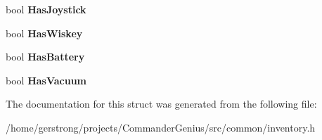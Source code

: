 \begin{DoxyCompactItemize}
\item 
\hypertarget{structst_inventory_aeba3902b7d60f4b0484804e1229f3ba8}{
bool {\bfseries HasJoystick}}
\label{structst_inventory_aeba3902b7d60f4b0484804e1229f3ba8}

\item 
\hypertarget{structst_inventory_a89879a66383a9da2f9d29e397c29890a}{
bool {\bfseries HasWiskey}}
\label{structst_inventory_a89879a66383a9da2f9d29e397c29890a}

\item 
\hypertarget{structst_inventory_ae25a366d423e0ac2b197906b10848df0}{
bool {\bfseries HasBattery}}
\label{structst_inventory_ae25a366d423e0ac2b197906b10848df0}

\item 
\hypertarget{structst_inventory_a5b613bb8a6417af6cf2189c25acdae50}{
bool {\bfseries HasVacuum}}
\label{structst_inventory_a5b613bb8a6417af6cf2189c25acdae50}

\end{DoxyCompactItemize}


The documentation for this struct was generated from the following file:\begin{DoxyCompactItemize}
\item 
/home/gerstrong/projects/CommanderGenius/src/common/inventory.h\end{DoxyCompactItemize}
